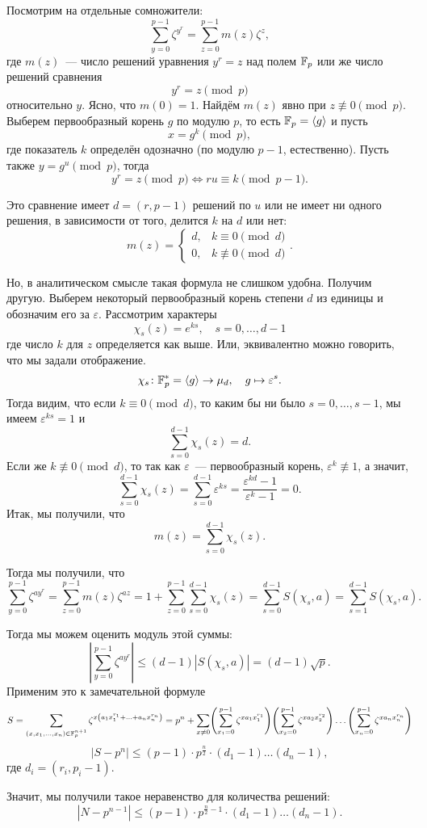 	Посмотрим на отдельные сомножители: 
	\[
		\sum_{y = 0}^{p - 1} \zeta^{y^{r}} = \sum_{z = 0}^{p - 1} m(z) \zeta^{z},
	\]
	где $m(z)$~--- число решений уравнения $y^r = z$ над полем $\mathbb{F}_p$ или же число решений сравнения 
	\[
		y^r = z \pmod{p}
	\]
	относительно $y$. Ясно, что $m(0) = 1$. Найдём $m(z)$ явно при $z \not\equiv 0 \pmod{p}$. Выберем первообразный корень $g$ по модулю $p$, то есть $\mathbb{F}_{p} = \langle g \rangle$ и пусть 
	\[
		x = g^k \pmod{p},
	\]
	где показатель $k$ определён одозначно (по модулю $p - 1$, естественно). Пусть также $y = g^{u} \pmod{p}$, тогда 
	\[
		y^r = z \pmod{p} \Leftrightarrow ru \equiv k \pmod{p - 1}.
	\]

	Это сравнение имеет $d = (r, p - 1)$ решений по $u$ или не имеет ни одного решения, в зависимости от того, делится $k$ на $d$ или нет: 
	\[
		m(z) = \begin{cases} d, & k \equiv 0 \pmod{d} \\ 0, & k \not\equiv 0 \pmod{d} \end{cases}.
	\]

	Но, в аналитическом смысле такая формула не слишком удобна. Получим другую. Выберем некоторый первообразный корень степени $d$ из единицы и обозначим его за $\varepsilon$. Рассмотрим характеры 
	\[
		\chi_{s}(z) = e^{k s}, \quad s = 0, \ldots, d - 1
	\]
	где число $k$ для $z$ определяется как выше. Или, эквивалентно можно говорить, что мы задали отображение. 
	\[
		\chi_s \colon \mathbb{F}_p^* = \langle g \rangle \to \mu_{d}, \quad g \mapsto \varepsilon^s.
	\]
	Тогда видим, что если $k \equiv 0 \pmod d$, то каким бы ни было $s = 0, \ldots, s - 1$, мы имеем $\varepsilon^{k s} = 1$ и 
	\[
		\sum_{s = 0}^{d - 1} \chi_s(z) = d.
	\]
	Если же $k \not\equiv 0 \pmod{d}$, то так как $\varepsilon$~--- первообразный корень, $\varepsilon^{k} \not \equiv 1$, а значит, 
	\[
		\sum_{s = 0}^{d - 1} \chi_s(z) = \sum_{s = 0}^{d - 1} \varepsilon^{ks} = \frac{\varepsilon^{kd} - 1}{\varepsilon^k - 1} = 0.
	\]
	Итак, мы получили, что 
	\[
		m(z) = \sum_{s = 0}^{d - 1} \chi_s(z).
	\]

	Тогда мы получили, что 
	\[
		\sum_{y = 0}^{p - 1} \zeta^{a y^{r}} = \sum_{z = 0}^{p - 1} m(z) \zeta^{a z} = 1 + \sum_{z = 0}^{p - 1} \sum_{s = 0}^{d - 1} \chi_s(z) = \sum_{s = 0}^{d - 1} S(\chi_s, a) = \sum_{s = 1}^{d - 1} S(\chi_s, a). 
	\]

	Тогда мы можем оценить модуль этой суммы: 
	\[
		\left\lvert \sum_{y = 0}^{p - 1} \zeta^{a y^{r}} \right\rvert \le  (d - 1) |S(\chi_s, a)| = (d - 1)\sqrt{p}.
	\]
	Применим это к замечательной формуле 
	\[
		S = \sum_{(x, x_1, \ldots, x_n) \in \F_p^{n + 1}} \zeta^{x\lr*{a_1 x_1^{r_1} + \ldots + a_n x_n^{r_n}}} = p^n + \sum_{x \neq 0} \lr*{ \sum_{x_1 = 0}^{p - 1} \zeta^{x a_1 x_1^{r_1}} }\lr*{ \sum_{x_2 = 0}^{p - 1} \zeta^{x a_2 x_2^{r_2}} } \ldots \lr*{ \sum_{x_n = 0}^{p - 1} \zeta^{x a_n x_n^{r_n}} }	
	\]
	\[
		|S - p^n| \le (p - 1) \cdot p^{\frac{n}{2}} \cdot (d_1 - 1) \ldots (d_n - 1),
	\]
	где $d_i = (r_i, p_i - 1)$. 

	Значит, мы получили такое неравенство для количества решений: 
	\[
		|N - p^{n - 1}| \le (p - 1) \cdot p^{\frac{n}{2} - 1} \cdot (d_1 - 1) \ldots (d_n - 1).
	\]

	

 




	
	







	

